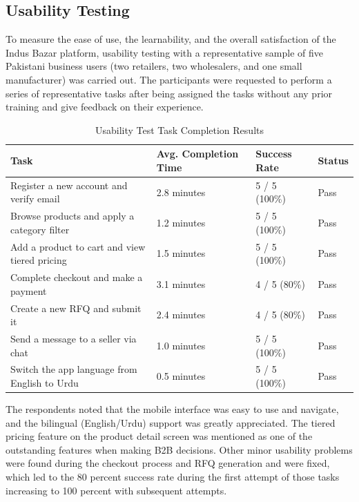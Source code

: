 \subsection{Usability Testing}
To measure the ease of use, the learnability, and the overall satisfaction of the Indus Bazar platform, usability testing with a representative sample of five Pakistani business users (two retailers, two wholesalers, and one small manufacturer) was carried out. The participants were requested to perform a series of representative tasks after being assigned the tasks without any prior training and give feedback on their experience.

\begin{table}[H]
\centering
\caption{Usability Test Task Completion Results}
\label{tab:usability_testing}
\renewcommand{\arraystretch}{1.3}
\small
\begin{tabular}{|p{5.5cm}|p{2.5cm}|p{2.5cm}|p{2.5cm}|}
\hline
\rowcolor{lightgray}
\textbf{Task} & \textbf{Avg. Completion Time} & \textbf{Success Rate} & \textbf{Status} \\
\hline
Register a new account and verify email & 2.8 minutes & 5 / 5 (100\%) & Pass \\
\hline
Browse products and apply a category filter & 1.2 minutes & 5 / 5 (100\%) & Pass \\
\hline
Add a product to cart and view tiered pricing & 1.5 minutes & 5 / 5 (100\%) & Pass \\
\hline
Complete checkout and make a payment & 3.1 minutes & 4 / 5 (80\%) & Pass \\
\hline
Create a new RFQ and submit it & 2.4 minutes & 4 / 5 (80\%) & Pass \\
\hline
Send a message to a seller via chat & 1.0 minutes & 5 / 5 (100\%) & Pass \\
\hline
Switch the app language from English to Urdu & 0.5 minutes & 5 / 5 (100\%) & Pass \\
\hline
\end{tabular}
\end{table}

The respondents noted that the mobile interface was easy to use and navigate, and the bilingual (English/Urdu) support was greatly appreciated. The tiered pricing feature on the product detail screen was mentioned as one of the outstanding features when making B2B decisions. Other minor usability problems were found during the checkout process and RFQ generation and were fixed, which led to the 80 percent success rate during the first attempt of those tasks increasing to 100 percent with subsequent attempts.

